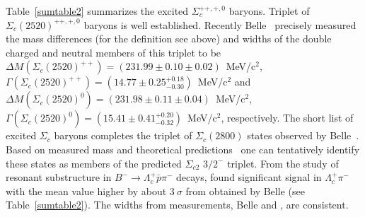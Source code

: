\begin{table}[t]
\caption{Summary of excited $\Lambda_c^+$ baryons family.} 
\label{sumtable1} 
\end{table}


Table~\ref{sumtable2} summarizes the excited $\Sigma_c^{++,+,0}$ baryons.
Triplet of $\Sigma_c(2520)^{++,+,0}$ baryons is well established. 
Recently Belle~\cite{SHLee:2014} 
precisely measured the mass differences (for the definition see above)  
and widths of the double charged and neutral members of this triplet 
to be $\Delta M(\Sigma_c(2520)^{++})=(231.99\pm 0.10\pm 0.02)$~MeV/c$^2$, 
$\Gamma(\Sigma_c(2520)^{++})=(14.77\pm 0.25^{+0.18}_{-0.30})$~MeV/c$^2$ and 
$\Delta M(\Sigma_c(2520)^{0})=(231.98\pm 0.11\pm 0.04)$~MeV/c$^2$, 
$\Gamma(\Sigma_c(2520)^{0})=(15.41\pm 0.41^{+0.20}_{-0.32})$~MeV/c$^2$, respectively. 
The short list of excited $\Sigma_c$ baryons completes the triplet 
of $\Sigma_c(2800)$ states observed by Belle~\cite{Mizuk:2004yu}. Based 
on measured mass and theoretical predictions~\cite{Copley:1979wj,Pirjol:1997nh} 
one can tentatively identify these states as members of the predicted 
$\Sigma_{c2}$ $3/2^-$ triplet. From the study of resonant substructure 
in $B^-\rightarrow \Lambda_c^+\bar{p}\pi^-$ decays, \babar found 
significant signal in $\Lambda_c^+\pi^-$ with the mean value 
higher by about $3~\sigma$ from obtained by Belle (see 
Table~\ref{sumtable2}). The widths from measurements, 
Belle and \babar, are consistent.


